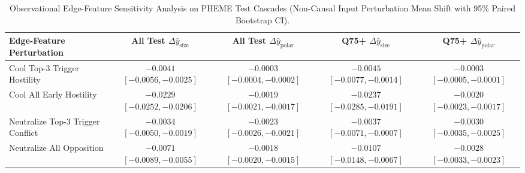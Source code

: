 \begin{table}[t]
\centering
\caption{Observational Edge-Feature Sensitivity Analysis on PHEME Test Cascades (Non-Causal Input Perturbation Mean Shift with 95\% Paired Bootstrap CI).}
\label{tab:mechanisms_pheme}
\begin{tabular}{lcccc}
\toprule
Edge-Feature Perturbation & All Test $\Delta \hat{y}_{\mathrm{size}}$ & All Test $\Delta \hat{y}_{\mathrm{polar}}$ & Q75+ $\Delta \hat{y}_{\mathrm{size}}$ & Q75+ $\Delta \hat{y}_{\mathrm{polar}}$ \\
\midrule
Cool Top-3 Trigger Hostility & $-0.0041$ $[-0.0056, -0.0025]$ & $-0.0003$ $[-0.0004, -0.0002]$ & $-0.0045$ $[-0.0077, -0.0014]$ & $-0.0003$ $[-0.0005, -0.0001]$ \\
Cool All Early Hostility & $-0.0229$ $[-0.0252, -0.0206]$ & $-0.0019$ $[-0.0021, -0.0017]$ & $-0.0237$ $[-0.0285, -0.0191]$ & $-0.0020$ $[-0.0023, -0.0017]$ \\
Neutralize Top-3 Trigger Conflict & $-0.0034$ $[-0.0050, -0.0019]$ & $-0.0023$ $[-0.0026, -0.0021]$ & $-0.0037$ $[-0.0071, -0.0007]$ & $-0.0030$ $[-0.0035, -0.0025]$ \\
Neutralize All Opposition & $-0.0071$ $[-0.0089, -0.0055]$ & $-0.0018$ $[-0.0020, -0.0015]$ & $-0.0107$ $[-0.0148, -0.0067]$ & $-0.0028$ $[-0.0033, -0.0023]$ \\
\bottomrule
\end{tabular}
\end{table}
